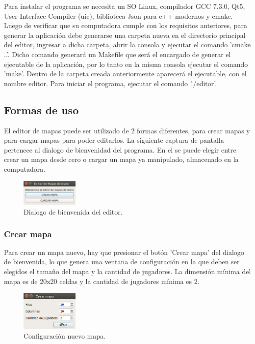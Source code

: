 \documentclass[titlepage,a4paper,12pt]{article}
\begin{document}
Para instalar el programa se necesita un SO Linux, compilador GCC 7.3.0, Qt5, User Interface Compiler (uic), biblioteca Json para c++ modernos y cmake. Luego de verificar que su computadora cumple con los requisitos anteriores, para generar la aplicación debe generarse una carpeta nueva en el directorio principal del editor, ingresar a dicha carpeta, abrir la consola y ejecutar el comando 'cmake ..'. Dicho comando generará un Makefile que será el encargado de generar el ejecutable de la aplicación, por lo tanto en la misma consola ejecutar el comando 'make'. Dentro de la carpeta creada anteriormente aparecerá el ejecutable, con el nombre editor. Para iniciar el programa, ejecutar el comando './editor'.\\

\subsection{Formas de uso}

El editor de mapas puede ser utilizado de 2 formas diferentes, para crear mapas y para cargar mapas para poder editarlos. La siguiente captura de pantalla pertenece al dialogo de bienvenidad del programa. En el se puede elegir entre crear un mapa desde cero o cargar un mapa ya manipulado, almacenado en la computadora.

\begin{figure}[H]
	\centering
	\includegraphics[width=0.25\textwidth]{../imagenes/bienvenida_editor.png}
	\caption{\label{fig:menu_editor} Dialogo de bienvenida del editor.}
\end{figure}

\subsubsection{Crear mapa}

Para crear un mapa nuevo, hay que presionar el botón 'Crear mapa' del dialogo de bienvenida, lo que genera una ventana de configuración en la que deben ser elegidos el tamaño del mapa y la cantidad de jugadores. La dimensión mínima del mapa es de 20x20 celdas y la cantidad de jugadores mínima es 2. \\

\begin{figure}[H]
	\centering
	\includegraphics[width=0.25\textwidth]{../imagenes/conf_nuevo_mapa.png}
	\caption{\label{fig:menu_editor} Configuración nuevo mapa.}
\end{figure}
\end{document}
